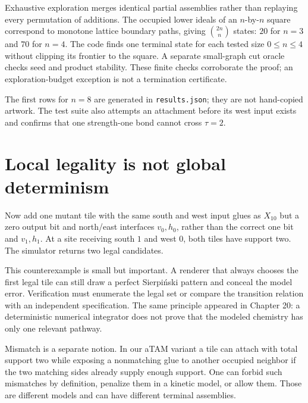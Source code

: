 
Exhaustive exploration merges identical partial assemblies rather than replaying
every permutation of additions. The occupied lower ideals of an $n$-by-$n$
square correspond to monotone lattice boundary paths, giving
$\binom{2n}{n}$ states: $20$ for $n=3$ and $70$ for $n=4$. The code finds one
terminal state for each tested size $0\le n\le4$ without clipping its frontier
to the square. A separate small-graph cut oracle checks seed and product
stability. These finite checks corroborate the proof; an exploration-budget
exception is not a termination certificate.

The first rows for $n=8$ are generated in \texttt{results.json}; they are not
hand-copied artwork. The test suite also attempts an attachment before its west
input exists and confirms that one strength-one bond cannot cross $\tau=2$.

\section{Local legality is not global determinism}

Now add one mutant tile with the same south and west input glues as $X_{10}$ but
a zero output bit and north/east interfaces $v_0,h_0$, rather than the correct
one bit and $v_1,h_1$. At a site receiving south $1$ and west
$0$, both tiles have support two. The simulator returns two legal candidates.


This counterexample is small but important. A renderer that always chooses the
first legal tile can still draw a perfect Sierpiński pattern and conceal the
model error. Verification must enumerate the legal set or compare the transition
relation with an independent specification. The same principle appeared in
Chapter 20: a deterministic numerical integrator does not prove that the modeled
chemistry has only one relevant pathway.

Mismatch is a separate notion. In our aTAM variant a tile can attach with total
support two while exposing a nonmatching glue to another occupied neighbor if
the two matching sides already supply enough support. One can forbid such
mismatches by definition, penalize them in a kinetic model, or allow them.
Those are different models and can have different terminal assemblies.


